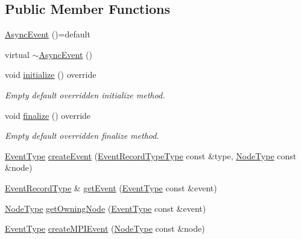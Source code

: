 \subsection*{Public Member Functions}
\begin{DoxyCompactItemize}
\item 
\hyperlink{structvt_1_1event_1_1_async_event_ad9837496e616789010bdbeefa968639d}{Async\+Event} ()=default
\item 
virtual \hyperlink{structvt_1_1event_1_1_async_event_a605a6078d0bcd10467a21464fe143561}{$\sim$\+Async\+Event} ()
\item 
void \hyperlink{structvt_1_1event_1_1_async_event_ac8d9f977b1cca3f43a06d0e83bc88e3d}{initialize} () override
\begin{DoxyCompactList}\small\item\em Empty default overridden initialize method. \end{DoxyCompactList}\item 
void \hyperlink{structvt_1_1event_1_1_async_event_a77e3aafaae98603825556cdf8105ba57}{finalize} () override
\begin{DoxyCompactList}\small\item\em Empty default overridden finalize method. \end{DoxyCompactList}\item 
\hyperlink{namespacevt_a009267401def7ae8bf201892222d060f}{Event\+Type} \hyperlink{structvt_1_1event_1_1_async_event_abc1629d13f9f3391e5e7f9ebc6303265}{create\+Event} (\hyperlink{namespacevt_1_1event_a1ea9fec44d101bf40b8fd786d44ebed9}{Event\+Record\+Type\+Type} const \&type, \hyperlink{namespacevt_a866da9d0efc19c0a1ce79e9e492f47e2}{Node\+Type} const \&node)
\item 
\hyperlink{structvt_1_1event_1_1_async_event_a5b4ef37db6e5962fdc0e6e0e56e74bc1}{Event\+Record\+Type} \& \hyperlink{structvt_1_1event_1_1_async_event_a78e777586ef948a4436b8dcea3c33be4}{get\+Event} (\hyperlink{namespacevt_a009267401def7ae8bf201892222d060f}{Event\+Type} const \&event)
\item 
\hyperlink{namespacevt_a866da9d0efc19c0a1ce79e9e492f47e2}{Node\+Type} \hyperlink{structvt_1_1event_1_1_async_event_a288c3db66bf12de8dc65733b184870c0}{get\+Owning\+Node} (\hyperlink{namespacevt_a009267401def7ae8bf201892222d060f}{Event\+Type} const \&event)
\item 
\hyperlink{namespacevt_a009267401def7ae8bf201892222d060f}{Event\+Type} \hyperlink{structvt_1_1event_1_1_async_event_ae94bb2059c35857a228fd55ab5512272}{create\+M\+P\+I\+Event} (\hyperlink{namespacevt_a866da9d0efc19c0a1ce79e9e492f47e2}{Node\+Type} const \&node)

\end{DoxyCompactItemize}
